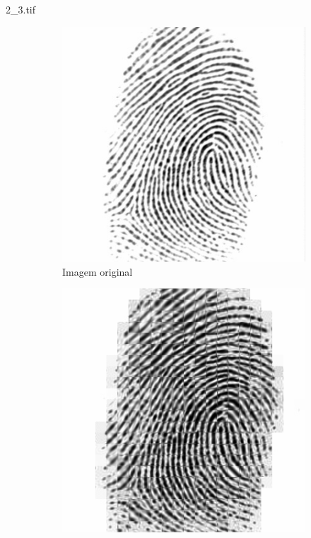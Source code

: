 \documentclass{beamer}
\begin{document}
    \begin{frame}{2\_3.tif}
        \begin{figure}
            \centering
            \begin{subfigure}[!ht]{0.32\textwidth}
                \includegraphics[width=\columnwidth]{Fingerprints/2_3.jpg}
                \caption{Imagem original}
            \end{subfigure}
            \begin{subfigure}[!ht]{0.32\textwidth}
                \includegraphics[width=\columnwidth]{Fingerprints/2_3_intermediate.jpg}

\end{subfigure}
\end{figure}
\end{frame}
\end{document}
